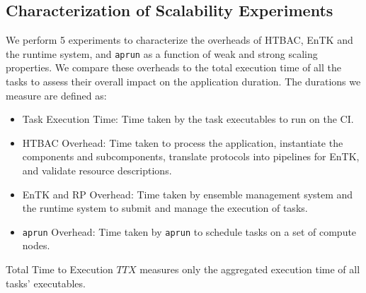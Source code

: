 
\subsection{Characterization of Scalability Experiments}


We perform 5 experiments to characterize the overheads of HTBAC, EnTK and the 
runtime system, and \texttt{aprun} as a function of weak and strong scaling 
properties. We compare these overheads to the total execution time of all the 
tasks to assess their overall impact on the application duration. 
The durations we measure are defined as:

\begin{itemize}
    \item Task Execution Time: Time taken by the task executables to run on the 
    CI. 
    \item HTBAC Overhead: Time taken to process the application, instantiate the 
    components and subcomponents, translate protocols into pipelines for EnTK, 
    and validate resource descriptions. 
    \item EnTK and RP Overhead: Time taken by ensemble management system and the 
    runtime system to submit and manage the execution of tasks. 
    \item \texttt{aprun} Overhead: Time taken by \texttt{aprun} to schedule
    tasks on a set of compute nodes. 
\end{itemize} 

Total Time to Execution \(TTX\) measures only the aggregated execution time of 
all tasks' executables. 


